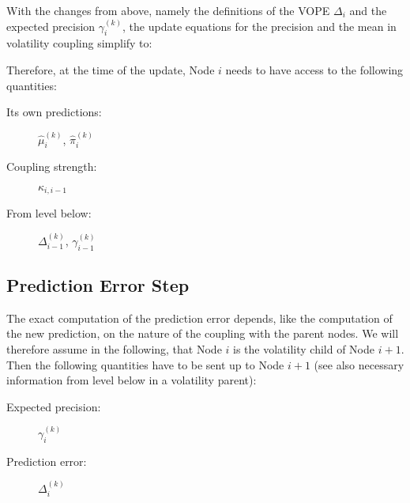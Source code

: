 With the changes from above, namely the definitions of the \textsf{VOPE} $\Delta_i$ and the expected precision $\gamma_i^{(k)}$, the update equations for the precision and the mean in volatility coupling simplify to:
\vspace{0.5cm}

\noindent
{}%
\vspace{0.5cm}

\noindent
Therefore, at the time of the update, Node $i$ needs to have access to the following quantities:

\begin{description}
\item[Its own predictions:]  	$\hat{\mu}_i^{(k)}$, $\hat{\pi}_i^{(k)}$
\item[Coupling strength:] 		$\kappa_{i,i-1}$
\item[From level below:]		$\Delta_{i-1}^{(k)}$, $\gamma_{i-1}^{(k)}$
\end{description}


\subsection{Prediction Error Step}
The exact computation of the prediction error depends, like the computation of the new prediction, on the nature of the coupling with the parent nodes. We will therefore assume in the following, that Node $i$ is the volatility child of Node $i+1$. Then the following quantities have to be sent up to Node $i+1$ (see also necessary information from level below in a volatility parent):

\begin{description}
\item[Expected precision:] 		$\gamma_{i}^{(k)}$
\item[Prediction error:]		$\Delta_{i}^{(k)}$
\end{description}

